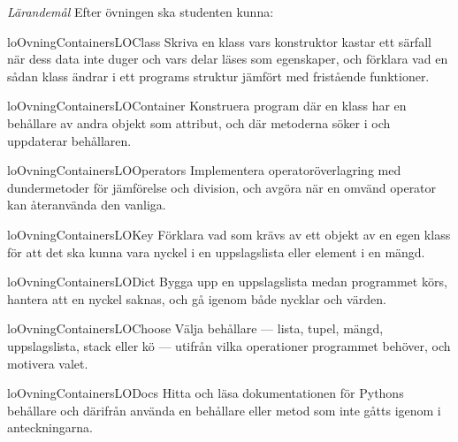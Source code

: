 \emph{Lärandemål}
Efter övningen ska studenten kunna:
\begin{restatable}{lo}{OvningContainersLOClass}%
  \label{OvningContainersLOClass}%
  Skriva en klass vars konstruktor kastar ett särfall när dess data inte
  duger och vars delar läses som egenskaper, och förklara vad en sådan
  klass ändrar i ett programs struktur jämfört med fristående
  funktioner.
\end{restatable}%
\begin{restatable}{lo}{OvningContainersLOContainer}%
  \label{OvningContainersLOContainer}%
  Konstruera program där en klass har en behållare av andra objekt som
  attribut, och där metoderna söker i och uppdaterar behållaren.
\end{restatable}%
\begin{restatable}{lo}{OvningContainersLOOperators}%
  \label{OvningContainersLOOperators}%
  Implementera operatoröverlagring med dundermetoder för jämförelse och
  division, och avgöra när en omvänd operator kan återanvända den
  vanliga.
\end{restatable}%
\begin{restatable}{lo}{OvningContainersLOKey}%
  \label{OvningContainersLOKey}%
  Förklara vad som krävs av ett objekt av en egen klass för att det ska
  kunna vara nyckel i en uppslagslista eller element i en mängd.
\end{restatable}%
\begin{restatable}{lo}{OvningContainersLODict}%
  \label{OvningContainersLODict}%
  Bygga upp en uppslagslista medan programmet körs, hantera att en
  nyckel saknas, och gå igenom både nycklar och värden.
\end{restatable}%
\begin{restatable}{lo}{OvningContainersLOChoose}%
  \label{OvningContainersLOChoose}%
  Välja behållare --- lista, tupel, mängd, uppslagslista, stack eller
  kö --- utifrån vilka operationer programmet behöver, och motivera
  valet.
\end{restatable}%
\begin{restatable}{lo}{OvningContainersLODocs}%
  \label{OvningContainersLODocs}%
  Hitta och läsa dokumentationen för Pythons behållare och därifrån
  använda en behållare eller metod som inte gåtts igenom i
  anteckningarna.
\end{restatable}%

